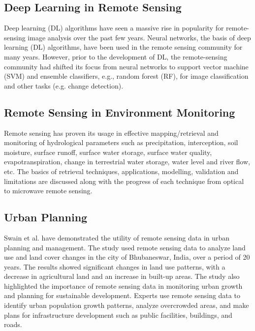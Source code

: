 \documentclass[conference]{IEEEtran}
\begin{document}
\subsection{Deep Learning in Remote Sensing}
Deep learning (DL) algorithms have seen a massive rise in popularity for remote-sensing image analysis over the past few years. Neural networks, the basis of deep learning (DL) algorithms, have been used in the remote sensing community for many years. However, prior to the development of DL, the remote-sensing community had shifted its focus from neural networks to support vector machine (SVM) and ensemble classifiers, e.g., random forest (RF), for image classification and other tasks (e.g. change detection). \cite{MA2019166} 

\subsection{Remote Sensing in Environment Monitoring}
Remote sensing has proven its usage in effective mapping/retrieval and monitoring of hydrological parameters such as precipitation, interception, soil moisture, surface runoff, surface water storage, surface water quality, evapotranspiration, change in terrestrial water storage, water level and river flow, etc. The basics of retrieval techniques, applications, modelling, validation and limitations are discussed along with the progress of each technique from optical to microwave remote sensing. \cite{Thakur2024}

\subsection{Urban Planning}
Swain et al. have demonstrated the utility of remote sensing data in urban planning and management. The study used remote sensing data to analyze land use and land cover changes in the city of Bhubaneswar, India, over a period of 20 years. The results showed significant changes in land use patterns, with a decrease in agricultural land and an increase in built-up areas. The study also highlighted the importance of remote sensing data in monitoring urban growth and planning for sustainable development. \cite{Swain2024}
Experts use remote sensing data to identify urban population growth patterns, analyze overcrowded areas, and make plans for infrastructure development such as public facilities, buildings, and roads.
\end{document}
